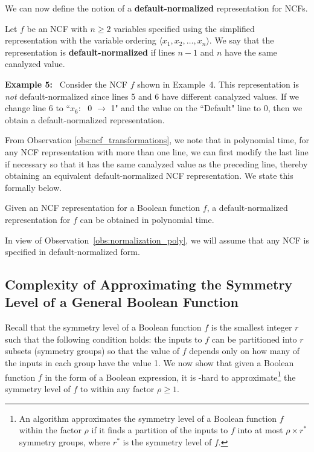 
\medskip
We can now define the notion of a \textbf{default-normalized} 
representation for NCFs.

\begin{definition}
\label{def:normalized}
Let $f$ be an NCF with $n \geq 2$ variables specified using
the simplified representation with 
the variable ordering $\langle x_1, x_2, \ldots, x_n\rangle$.
We say that the representation is {\bf default-normalized} if
lines $n-1$ and $n$ have the same canalyzed value.
\end{definition}

\noindent
\textbf{Example 5:}~ 
Consider the NCF $f$ shown in Example~4. 
This representation is \emph{not} default-normalized since lines 5 and 6
have different canalyzed values.
If we change line 6 to ``$x_6$:~ 0 $\longrightarrow$ 1" and the
value on the ``Default" line to 0, then we obtain 
a default-normalized representation. 

\medskip
From Observation \ref{obs:ncf_transformations},
we note that in polynomial time, for any NCF representation with more than one line,
we can first modify the last line if necessary 
so that it has the same canalyzed value as the preceding line,
thereby obtaining an equivalent default-normalized NCF representation.
We state this formally below.

\begin{observation}\label{obs:normalization_poly}
Given an NCF representation for a Boolean function $f$, a default-normalized
representation for $f$ can be obtained in polynomial time. \QED
\end{observation}

In view of Observation~\ref{obs:normalization_poly},
we will assume that any NCF is specified in default-normalized form.

\subsection{Complexity of Approximating the Symmetry Level of a 
General Boolean Function}
\label{sse:symmetry_level_hardness}

Recall that the symmetry level of a Boolean function $f$ is the smallest
integer $r$ such that the following condition holds:
the  inputs to $f$ can be partitioned into $r$ subsets 
(symmetry groups) so that the value of $f$ depends only on 
how many of the inputs in each group have the value 1.
We now show that given a Boolean function $f$
in the form of a Boolean expression, it is \cnp-hard to 
approximate\footnote{An algorithm approximates the symmetry
level of a Boolean function $f$ within the factor $\rho$ if it finds a
partition of the inputs to $f$ into at most $\rho \times r^*$ symmetry
groups, where $r^*$ is the symmetry level of $f$.}
the symmetry level of $f$ to within any factor $\rho \geq 1$.

